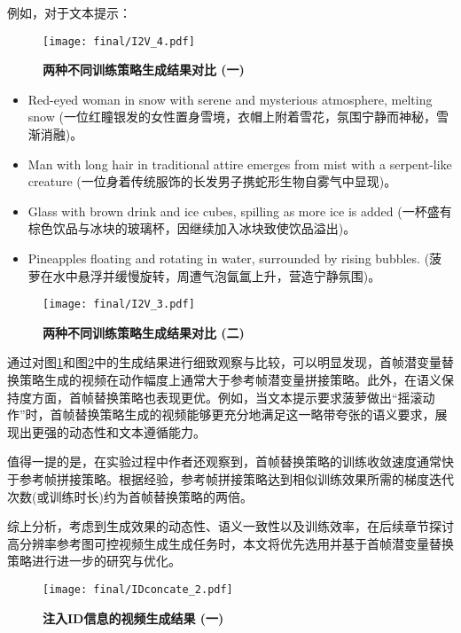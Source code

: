 例如，对于文本提示：
\begin{figure}[htbp]
    \centering
    \texttt{[image: final/I2V\_4.pdf]}
    \caption{\textbf{两种不同训练策略生成结果对比 (一)}}
    \label{I2V_4}
    \end{figure}
\begin{itemize}
\item Red-eyed woman in snow with serene and mysterious atmosphere, melting snow (一位红瞳银发的女性置身雪境，衣帽上附着雪花，氛围宁静而神秘，雪渐消融)。
\item Man with long hair in traditional attire emerges from mist with a serpent-like creature (一位身着传统服饰的长发男子携蛇形生物自雾气中显现)。
\item Glass with brown drink and ice cubes, spilling as more ice is added (一杯盛有棕色饮品与冰块的玻璃杯，因继续加入冰块致使饮品溢出)。
\item Pineapples floating and rotating in water, surrounded by rising bubbles. (菠萝在水中悬浮并缓慢旋转，周遭气泡氤氲上升，营造宁静氛围)。
\end{itemize}


\begin{figure}[htbp]
    \centering
    \texttt{[image: final/I2V\_3.pdf]}
    \caption{\textbf{两种不同训练策略生成结果对比 (二)}}
    \label{I2V_3}
\end{figure}

通过对图\ref{I2V_4}和图\ref{I2V_3}中的生成结果进行细致观察与比较，可以明显发现，首帧潜变量替换策略生成的视频在动作幅度上通常大于参考帧潜变量拼接策略。此外，在语义保持度方面，首帧替换策略也表现更优。例如，当文本提示要求菠萝做出“摇滚动作”时，首帧替换策略生成的视频能够更充分地满足这一略带夸张的语义要求，展现出更强的动态性和文本遵循能力。

值得一提的是，在实验过程中作者还观察到，首帧替换策略的训练收敛速度通常快于参考帧拼接策略。根据经验，参考帧拼接策略达到相似训练效果所需的梯度迭代次数(或训练时长)约为首帧替换策略的两倍。

综上分析，考虑到生成效果的动态性、语义一致性以及训练效率，在后续章节探讨高分辨率参考图可控视频生成生成任务时，本文将优先选用并基于首帧潜变量替换策略进行进一步的研究与优化。

\begin{figure}[htbp]
    \centering
    \texttt{[image: final/IDconcate\_2.pdf]}
    \caption{\textbf{注入ID信息的视频生成结果 (一)}}
    \label{IDconcate_2}
\end{figure}

